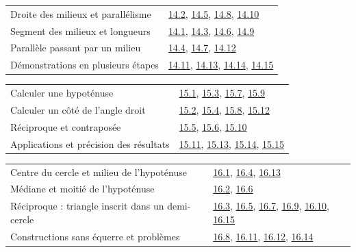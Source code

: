 \begin{tabularx}{\linewidth}{@{}Yl@{}}\toprule
Droite des milieux et parallélisme & \hyperref[exo-14-2]{14.2}, \hyperref[exo-14-5]{14.5}, \hyperref[exo-14-8]{14.8}, \hyperref[exo-14-10]{14.10}\\[2mm]
Segment des milieux et longueurs & \hyperref[exo-14-1]{14.1}, \hyperref[exo-14-3]{14.3}, \hyperref[exo-14-6]{14.6}, \hyperref[exo-14-9]{14.9}\\[2mm]
Parallèle passant par un milieu & \hyperref[exo-14-4]{14.4}, \hyperref[exo-14-7]{14.7}, \hyperref[exo-14-12]{14.12}\\[2mm]
Démonstrations en plusieurs étapes & \hyperref[exo-14-11]{14.11}, \hyperref[exo-14-13]{14.13}, \hyperref[exo-14-14]{14.14}, \hyperref[exo-14-15]{14.15}\\[2mm]
\bottomrule\end{tabularx}\par\vspace{4mm}
\begin{tabularx}{\linewidth}{@{}Yl@{}}\toprule
Calculer une hypoténuse & \hyperref[exo-15-1]{15.1}, \hyperref[exo-15-3]{15.3}, \hyperref[exo-15-7]{15.7}, \hyperref[exo-15-9]{15.9}\\[2mm]
Calculer un côté de l’angle droit & \hyperref[exo-15-2]{15.2}, \hyperref[exo-15-4]{15.4}, \hyperref[exo-15-8]{15.8}, \hyperref[exo-15-12]{15.12}\\[2mm]
Réciproque et contraposée & \hyperref[exo-15-5]{15.5}, \hyperref[exo-15-6]{15.6}, \hyperref[exo-15-10]{15.10}\\[2mm]
Applications et précision des résultats & \hyperref[exo-15-11]{15.11}, \hyperref[exo-15-13]{15.13}, \hyperref[exo-15-14]{15.14}, \hyperref[exo-15-15]{15.15}\\[2mm]
\bottomrule\end{tabularx}\par\vspace{4mm}
\clearpage
{}\fontsize{10}{13}\selectfont
{}\begin{tabularx}{\linewidth}{@{}Yl@{}}\toprule
Centre du cercle et milieu de l’hypoténuse & \hyperref[exo-16-1]{16.1}, \hyperref[exo-16-4]{16.4}, \hyperref[exo-16-13]{16.13}\\[2mm]
Médiane et moitié de l’hypoténuse & \hyperref[exo-16-2]{16.2}, \hyperref[exo-16-6]{16.6}\\[2mm]
Réciproque : triangle inscrit dans un demi-cercle & \hyperref[exo-16-3]{16.3}, \hyperref[exo-16-5]{16.5}, \hyperref[exo-16-7]{16.7}, \hyperref[exo-16-9]{16.9}, \hyperref[exo-16-10]{16.10}, \hyperref[exo-16-15]{16.15}\\[2mm]
Constructions sans équerre et problèmes & \hyperref[exo-16-8]{16.8}, \hyperref[exo-16-11]{16.11}, \hyperref[exo-16-12]{16.12}, \hyperref[exo-16-14]{16.14}\\[2mm]
\bottomrule\end{tabularx}\par\vspace{4mm}
